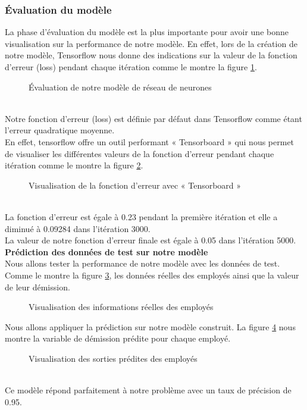 \subsubsection{Évaluation du modèle}
La phase d'évaluation du modèle est la plus importante pour avoir une bonne visualisation sur la performance de notre modèle.
En effet, lors de la création de notre modèle, Tensorflow nous donne des indications sur la valeur de la fonction d'erreur (loss) pendant chaque itération comme le montre la figure \ref{fig:eval}.
     \begin{figure}[htpb]
    \centering
    \caption{Évaluation de notre modèle de réseau de neurones}
    \label{fig:eval}
    \end{figure}
    \\
Notre fonction d'erreur (loss) est définie par défaut dans Tensorflow comme étant l'erreur quadratique moyenne.\\
En effet, tensorflow offre un outil performant « Tensorboard » qui nous permet de visualiser les différentes valeurs de la fonction d’erreur pendant chaque itération comme le montre la figure \ref{fig:tensorboard}.
     \begin{figure}[htpb]
    \centering
    \caption{Visualisation de la fonction d'erreur avec « Tensorboard »}
    \label{fig:tensorboard}
    \end{figure}
    \\
La fonction d’erreur est égale à 0.23 pendant la première itération et elle a diminué à 0.09284 dans l’itération 3000.\\La valeur de notre fonction d’erreur finale est égale à 0.05 dans l’itération 5000.\\
\textbf{Prédiction des données de test sur notre modèle}\\
Nous allons tester la performance de notre modèle avec les données de test.
Comme le montre la figure \ref{fig:predictiontest1}, les données réelles des employés ainsi que la valeur de leur démission.
     \begin{figure}[htpb]
    \centering
    \caption{Visualisation des informations réelles des employés}
    \label{fig:predictiontest1}
    \end{figure}
    \newpage
Nous allons appliquer la prédiction sur notre modèle construit.
La figure \ref{fig:predictiontest2} nous montre la variable de démission prédite pour chaque employé.
     \begin{figure}[htpb]
    \centering
    \caption{Visualisation des sorties prédites des employés}
    \label{fig:predictiontest2}
    \end{figure}
    \\
Ce modèle répond parfaitement à notre problème avec un taux de précision de 0.95.

